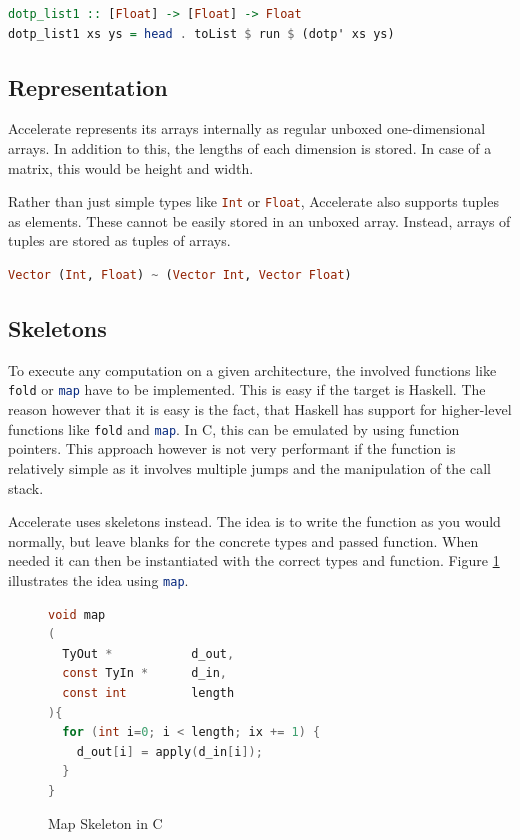 \documentclass[a4paper,bibliography=totocnumbered,parskip,headsepline]{scrbook}
\begin{document}
\begin{lstlisting}[language=haskell]
dotp_list1 :: [Float] -> [Float] -> Float
dotp_list1 xs ys = head . toList $ run $ (dotp' xs ys)
\end{lstlisting}

\subsection{Representation}
Accelerate represents its arrays internally as regular unboxed one-dimensional arrays.
In addition to this, the lengths of each dimension is stored.
In case of a matrix, this would be height and width.

Rather than just simple types like \lstinline[language=haskell]!Int! or \lstinline[language=haskell]!Float!, Accelerate also supports tuples as elements.
These cannot be easily stored in an unboxed array.
Instead, arrays of tuples are stored as tuples of arrays.

\begin{lstlisting}[language=haskell]
Vector (Int, Float) ~ (Vector Int, Vector Float)
\end{lstlisting}

\subsection{Skeletons}
To execute any computation on a given architecture, the involved functions like \lstinline[language=haskell,morekeywords={fold}]!fold! or \lstinline[language=haskell]!map! have to be implemented.
This is easy if the target is Haskell.
The reason however that it is easy is the fact, that Haskell has support for higher-level functions like \lstinline[language=haskell,morekeywords={fold}]!fold! and \lstinline[language=haskell]!map!.
In C, this can be emulated by using function pointers.
This approach however is not very performant if the function is relatively simple as it involves multiple jumps and the manipulation of the call stack.

Accelerate uses skeletons instead.
The idea is to write the function as you would normally, but leave blanks for the concrete types and passed function.
When needed it can then be instantiated with the correct types and function.
Figure \ref{fig:mapskelC} illustrates the idea using \lstinline[language=haskell]!map!.

\begin{figure}[htb]
\begin{lstlisting}[language=C]
void map
(
  TyOut *           d_out,
  const TyIn *      d_in,
  const int         length
){
  for (int i=0; i < length; ix += 1) {
    d_out[i] = apply(d_in[i]);
  }
}
\end{lstlisting}
\caption{Map Skeleton in C}
\label{fig:mapskelC}
\end{figure}
\end{document}
